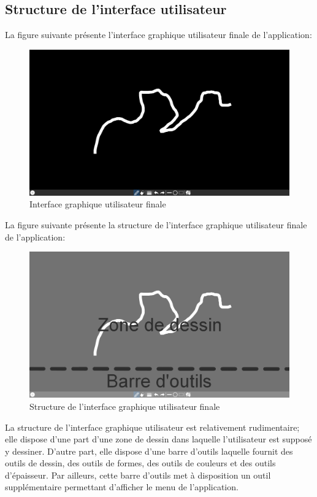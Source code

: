 \documentclass[11pt,a4paper,oldfontcommands]{memoir}
\begin{document}
\subsection{Structure de l'interface utilisateur}

La figure suivante présente l'interface graphique utilisateur finale de l'application:

\begin{figure}[H]
\centering
\includegraphics[scale=0.4]{images/ui-final.png}
\caption{Interface graphique utilisateur finale}
\end{figure}

La figure suivante présente la structure de l'interface graphique utilisateur finale de l'application:

\begin{figure}[h]
\centering
\includegraphics[scale=0.4]{images/ui-final-structure.png}
\caption{Structure de l'interface graphique utilisateur finale}
\end{figure}

La structure de l'interface graphique utilisateur est relativement rudimentaire; elle dispose d'une part d'une zone de dessin dans laquelle l'utilisateur est supposé y dessiner. D'autre part, elle dispose d'une barre d'outils laquelle fournit des outils de dessin, des outils de formes, des outils de couleurs et des outils d'épaisseur. Par ailleurs, cette barre d'outils met à disposition un outil supplémentaire permettant d'afficher le menu de l'application.
\end{document}
